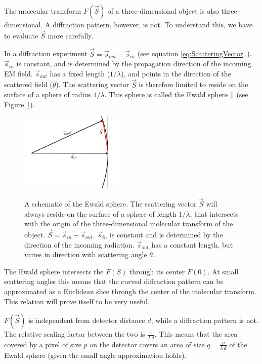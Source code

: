The molecular transform $F(\vec{S})$ of a three-dimensional object is also three-dimensional. A diffraction pattern, however, is not. To understand this, we have to evaluate $\vec{S}$ more carefully. 

In a diffraction experiment $\vec{S} = \vec{s}_{out} -\vec{s}_{in}$ (see equation \ref{eq:ScatteringVector},). $\vec{s}_{in}$ is constant, and is determined by the propagation direction of the incoming EM field. $\vec{s}_{out}$ has a fixed length ($1/\lambda$), and points in the direction of the scattered field ($\theta$). The scattering vector $\vec{S}$ is therefore limited to reside on the surface of a sphere of radius $1/\lambda$. This sphere is called the Ewald sphere [] (see Figure \ref{fig:EwaldSphere}). 

\begin{figure}[h]
	\centering 
	\includegraphics[width=50mm]{ewald_sphere.png}
	\label{fig:EwaldSphere}
	\caption{A schematic of the Ewald sphere. The scattering vector $\vec{S}$ will always reside on the surface of a sphere of length $1/\lambda$, that intersects with the origin of the three-dimensional molecular transform of the object. $\vec{S} = \vec{s}_{in} - \vec{s}_{out}$. $\vec{s}_{in}$ is constant and is determined by the direction of the incoming radiation. $\vec{s}_{out}$ has a constant length, but varies in direction with scattering angle $\theta$. }
\end{figure}

The Ewald sphere intersects the $F(S)$ through its center $F(0)$. At small scattering angles this means that the curved diffraction pattern can be approximated as a Euclidean slice through the center of the molecular transform.  This relation will prove itself to be very useful.

$F(\vec{S})$ is independent from detector distance $d$, while a diffraction pattern is not. The relative scaling factor between the two is $\frac{1}{\lambda\,d}$. This means that the area covered by a pixel of size $p$ on the detector covers an area of size $q = \frac{p}{\lambda \, d}$ of the Ewald sphere (given the small angle approximation holds). 


